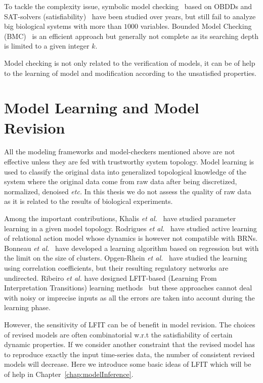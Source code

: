To tackle the complexity issue, symbolic model checking~\cite{burch1992symbolic} based on OBDDs and SAT-solvers (satisfiability)~\cite{abdulla2000symbolic} have been studied over years, but still fail to analyze big biological systems with more than $1000$ variables. 
Bounded Model Checking (BMC)~\cite{clarke2001bounded} is an efficient approach but generally not complete as its searching depth is limited to a given integer $k$.

Model checking is not only related to the verification of models, it can be of help to the learning of model and modification according to the unsatisfied properties.

\section{Model Learning and Model Revision}
All the modeling frameworks and model-checkers mentioned above are not effective unless they are fed with trustworthy system topology.
Model learning is used to classify the original data into generalized topological knowledge of the system where the original data come from raw data after being discretized, normalized, denoised \textit{etc.}
In this thesis we do not assess the quality of raw data as it is related to the results of biological experiments.

Among the important contributions, Khalis \textit{et al.}~\cite{khalis2009smbionet} have studied parameter learning in a given model topology.
Rodrigues \textit{et al.}~\cite{rodrigues2011active} have studied active learning of relational action model whose dynamics is however not compatible with BRNs.
Bonneau \textit{et al.}~\cite{bonneau2006inferelator} have developed a learning algorithm based on regression but with the limit on the size of clusters.
Opgen-Rhein \textit{et al.}~\cite{opgen2007correlation} have studied the learning using correlation coefficients, but their resulting regulatory networks are undirected. 
Ribeiro \textit{et al.} have designed LFIT-based (Learning From Interpretation Transitions) learning methods~\cite{ribeiro2015learning,ribeiro2018learning,ribeiro2017inductive} but these approaches cannot deal with noisy or imprecise inputs as all the errors are taken into account during the learning phase.

However, the sensitivity of LFIT can be of benefit in model revision.
The choices of revised models are often combinatorial w.r.t the satisfiability of certain dynamic properties.
If we consider another constraint that the revised model has to reproduce exactly the input time-series data, the number of consistent revised models will decrease.
Here we introduce some basic ideas of LFIT which will be of help in Chapter~\ref{chap:modelInference}.

